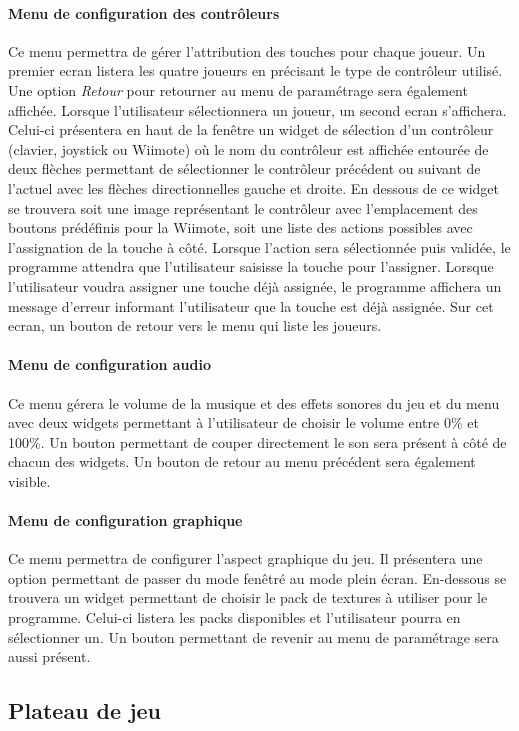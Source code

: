 \paragraph{Menu de configuration des contrôleurs}

Ce menu permettra de gérer l'attribution des touches pour chaque joueur. Un premier ecran listera les quatre joueurs en précisant le type de contrôleur utilisé. Une option \emph{Retour} pour retourner au menu de paramétrage sera également affichée. Lorsque l'utilisateur sélectionnera un joueur, un second ecran s'affichera. Celui-ci présentera en haut de la fenêtre un widget de sélection d'un contrôleur (clavier, joystick ou Wiimote) où le nom du contrôleur est affichée entourée de deux flèches permettant de sélectionner le contrôleur précédent ou suivant de l'actuel avec les flèches directionnelles gauche et droite. En dessous de ce widget se trouvera soit une image représentant le contrôleur avec l'emplacement des boutons prédéfinis pour la Wiimote, soit une liste des actions possibles avec l'assignation de la touche à côté. Lorsque l'action sera sélectionnée puis validée, le programme attendra que l'utilisateur saisisse la touche pour l'assigner. Lorsque l'utilisateur voudra assigner une touche déjà assignée, le programme affichera un message d'erreur informant l'utilisateur que la touche est déjà assignée. Sur cet ecran, un bouton de retour vers le menu qui liste les joueurs.

\paragraph{Menu de configuration audio}

Ce menu gérera le volume de la musique et des effets sonores du jeu et du menu avec deux widgets permettant à l'utilisateur de choisir le volume entre 0\% et 100\%. Un bouton permettant de couper directement le son sera présent à côté de chacun des widgets. Un bouton de retour au menu précédent sera également visible.

\paragraph{Menu de configuration graphique}

Ce menu permettra de configurer l'aspect graphique du jeu. Il présentera une option permettant de passer du mode fenêtré au mode plein écran. En-dessous se trouvera un widget permettant de choisir le pack de textures à utiliser pour le programme. Celui-ci listera les packs disponibles et l'utilisateur pourra en sélectionner un. Un bouton permettant de revenir au menu de paramétrage sera aussi présent.

\subsection{Plateau de jeu}

